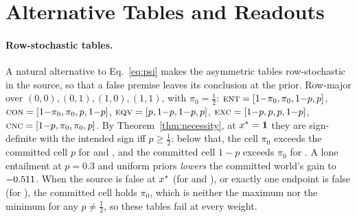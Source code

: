 \section{Alternative Tables and Readouts}
\label{app:earlier}

\paragraph{Row-stochastic tables.} A natural alternative to Eq.~\ref{eq:psi} makes the asymmetric
tables row-stochastic in the source, so that a false premise leaves its conclusion at the prior.
Row-major over $(0,0),(0,1),(1,0),(1,1)$, with $\pi_0=\frac12$:
$\textsc{ent}=[1{-}\pi_0,\pi_0,1{-}p,p]$, $\textsc{con}=[1{-}\pi_0,\pi_0,p,1{-}p]$, $\textsc{eqv}=[p,1{-}p,1{-}p,p]$,
$\textsc{exc}=[1{-}p,p,p,1{-}p]$, $\textsc{cnc}=[1{-}p,\pi_0,\pi_0,p]$. By Theorem~\ref{thm:necessity}, at $x^{\ast}=\mathbf{1}$
they are sign-definite with the intended sign iff $p\ge\frac12$: below that, the cell $\pi_0$ exceeds the committed cell
$p$ for \ent{} and \cnc{}, and the committed cell $1-p$ exceeds $\pi_0$ for \con{}. A lone
entailment at $p=0.3$ and uniform priors \emph{lowers} the committed world's gain to
$-0.511$. When the source is false at $x^{\ast}$ (for \ent{} and \con{}), or exactly one endpoint
is false (for \cnc{}), the committed cell holds $\pi_0$, which is neither the maximum nor the minimum
for any $p\neq\frac12$, so these tables fail at every weight.

